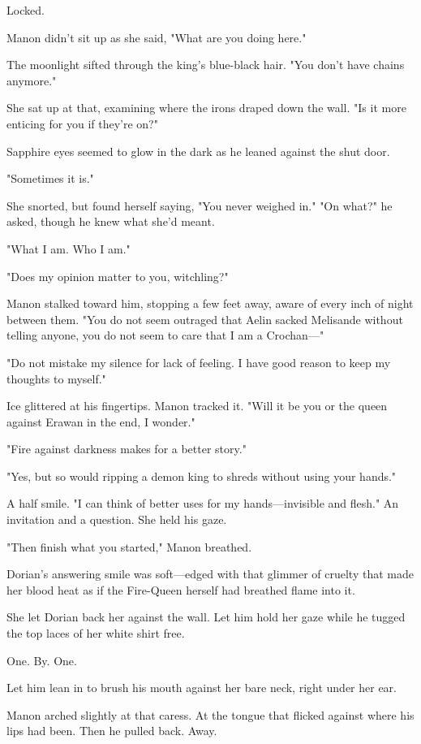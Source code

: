 Locked.

Manon didn't sit up as she said, "What are you doing here."

The moonlight sifted through the king's blue-black hair.
"You don't have chains anymore."

She sat up at that, examining where the irons draped down the wall.
"Is it more enticing for you if they're on?"

Sapphire eyes seemed to glow in the dark as he leaned against the shut door.

"Sometimes it is."

She snorted, but found herself saying, "You never weighed in."
"On what?"
he asked, though he knew what she'd meant.

"What I am.
Who I am."

"Does my opinion matter to you, witchling?"

Manon stalked toward him, stopping a few feet away, aware of every inch of night between them.
"You do not seem outraged that Aelin sacked Melisande without telling anyone, you do not seem to care that I am a Crochan---"

"Do not mistake my silence for lack of feeling.
I have good reason to keep my thoughts to myself."

Ice glittered at his fingertips.
Manon tracked it.
"Will it be you or the queen against Erawan in the end, I wonder."

"Fire against darkness makes for a better story."

"Yes, but so would ripping a demon king to shreds without using your hands."

A half smile.
"I can think of better uses for my hands---invisible and flesh."
An invitation and a question.
She held his gaze.

"Then finish what you started," Manon breathed.

Dorian's answering smile was soft---edged with that glimmer of cruelty that made her blood heat as if the Fire-Queen herself had breathed flame into it.

She let Dorian back her against the wall.
Let him hold her gaze while he tugged the top laces of her white shirt free.

One.
By.
One.

Let him lean in to brush his mouth against her bare neck, right under her ear.

Manon arched slightly at that caress.
At the tongue that flicked against where his lips had been.
Then he pulled back.
Away.


